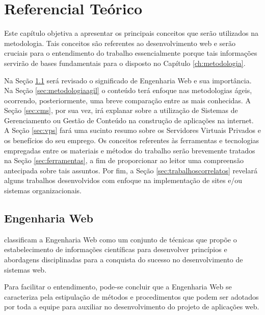 \chapter{Referencial Teórico}
\label{ch:referencial}
\hspace{2.5cm}

Este capítulo objetiva a apresentar os principais conceitos que serão utilizados na metodologia. Tais conceitos são referentes ao desenvolvimento web e serão cruciais para o entendimento do trabalho essencialmente porque tais informações servirão de bases fundamentais para o disposto no Capítulo \ref{ch:metodologia}.

Na Seção \ref{sec:engenhariaweb} será revisado o significado de Engenharia Web e sua importância. Na Seção \ref{sec:metodologiaagil} o conteúdo terá enfoque nas metodologias ágeis, ocorrendo, posteriormente, uma breve comparação entre as mais conhecidas. A Seção \ref{sec:cms}, por sua vez, irá explanar sobre a utilização de Sistemas de Gerenciamento ou Gestão de Conteúdo na construção de aplicações na internet. A Seção \ref{sec:vps} fará uma sucinto resumo sobre os Servidores Virtuais Privados e os benefícios do seu emprego. Os conceitos referentes às ferramentas e tecnologias empregadas entre os materiais e métodos do trabalho serão brevemente tratados na Seção \ref{sec:ferramentas}, a fim de proporcionar ao leitor uma compreensão antecipada sobre tais assuntos. Por fim, a Seção \ref{sec:trabalhoscorrelatos} revelará alguns trabalhos desenvolvidos com enfoque na implementação de sites e/ou sistemas organizacionais. 

\hspace{2.5cm}

\section{Engenharia Web}
\label{sec:engenhariaweb}
\hspace{2.5cm}

 classificam a Engenharia Web como um conjunto de técnicas que propõe o estabelecimento de informações científicas para desenvolver princípios e abordagens disciplinadas para a conquista do sucesso no desenvolvimento de sistemas web. 

Para facilitar o entendimento, pode-se concluir que a Engenharia Web se caracteriza pela estipulação de métodos e procedimentos que podem ser adotados por toda a equipe para auxiliar no desenvolvimento do projeto de aplicações web.

